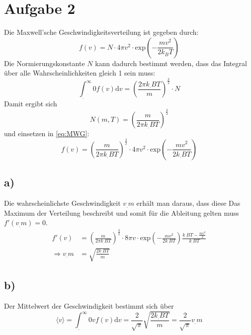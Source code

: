\section{Aufgabe 2}
\label{sec:Aufgabe2}
Die Maxwell'sche Geschwindigkeitsverteilung ist gegeben durch:
\begin{equation}
  f(v)=N\cdot 4\pi v^2 \cdot \text{exp}\left(-\frac{mv^2}{2k_BT}\right)\label{eq:MWG}
\end{equation}
Die Normierungskonstante $N$ kann dadurch bestimmt werden, dass das Integral über alle Wahrscheinlichkeiten gleich 1 sein muss:
\begin{equation}
  \int^{\infty}_.{0} f(v) \text{d}v = \left(\frac{2\pi k_.B T}{m}\right)^{\frac{3}{2}}\cdot N
\end{equation}
Damit ergibt sich
\begin{equation}
  N(m,T)= \left(\frac{m}{2\pi k_.B T}\right)^{\frac{3}{2}}
\end{equation}
und einsetzen in \eqref{eq:MWG}:
\begin{equation}
  f(v)=\left(\frac{m}{2\pi k_.B T}\right)^{\frac{3}{2}}\cdot 4\pi v^2 \cdot \text{exp}\left(-\frac{mv^2}{2k_.BT}\right)
\end{equation}

\subsection*{a)}

Die wahrscheinlichste Geschwindigkeit $v_.m$ erhält man daraus, dass diese Das Maximum der Verteilung beschreibt und somit für die Ableitung gelten muss $f'(v_.m)=0$.
\begin{align*}
  f'(v) &= \left(\frac{m}{2\pi k_.B T}\right)^{\frac{3}{2}}\cdot 8\pi v \cdot \text{exp}\left(-\frac{mv^2}{2k_.BT}\right)\frac{k_.BT-\frac{mv^2}{2}}{k_.BT}\\
\Rightarrow v_.m &= \sqrt{\frac{2k_.BT}{m}}
\end{align*}


\subsection*{b)}
Der Mittelwert der Geschwindigkeit bestimmt sich über
\begin{equation}
  \langle v \rangle = \int^{\infty}_.{0} v f(v) \text{d}v = \frac{2}{\sqrt{\pi}}\sqrt{\frac{2k_.BT}{m}} = \frac{2}{\sqrt{\pi}} v_.m
\end{equation}

